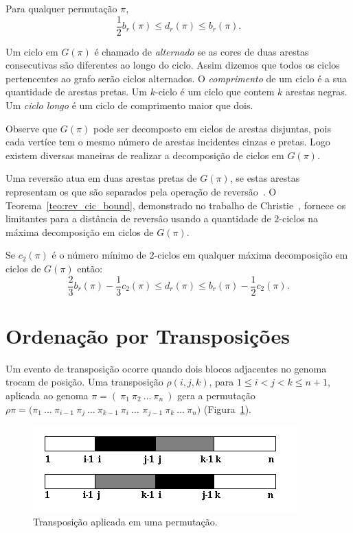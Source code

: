 \begin{teo}
\label{teo:rev_bkp_bound}
Para qualquer permutação $\pi$, 
\[\frac{1}{2} b_r(\pi) \leq d_r(\pi) \leq
  b_r(\pi).
\]
\end{teo}

Um ciclo em $G(\pi)$ é chamado de \textit{alternado} se as cores de
duas arestas consecutivas são diferentes ao longo do ciclo. Assim
dizemos que todos os ciclos pertencentes ao grafo serão ciclos
alternados. O \textit{comprimento} de um ciclo é a sua quantidade de
arestas pretas. Um $k$-ciclo é um ciclo que contem $k$ arestas
negras. Um \textit{ciclo longo} é um ciclo de comprimento maior que
dois.

Observe que $G(\pi)$ pode ser decomposto em ciclos de arestas
disjuntas, pois cada vertíce tem o mesmo número de arestas incidentes
cinzas e pretas. Logo existem diversas maneiras de realizar a
decomposição de ciclos em $G(\pi)$. 

Uma reversão atua em duas arestas pretas de $G(\pi)$, se estas arestas
representam os \bkp{} que são separados pela operação de
reversão~\cite{Christie*1998}. O Teorema~\ref{teo:rev_cic_bound},
demonstrado no trabalho de Christie~\cite{Christie*1998}, fornece os
limitantes para a distância de reversâo usando a quantidade de
$2$-ciclos na máxima decomposição em ciclos de $G(\pi)$.

\begin{teo}
\label{teo:rev_cic_bound}
Se $c_{2}(\pi)$ é o número mínimo de $2$-ciclos em qualquer máxima
decomposição em ciclos de $G(\pi)$ então: 
\[
\frac{2}{3} b_r(\pi)
- \frac{1}{3} c_{2}(\pi) \leq d_r(\pi) \leq b_r(\pi) - \frac{1}{2}
c_{2}(\pi).
\]
\end{teo}

\section{Ordenação por Transposições}
\label{sec:trans}
Um evento de transposição ocorre quando dois blocos adjacentes no
genoma trocam de posição. Uma transposição $\rho(i, j, k)$, para
$1 \leq i < j < k \leq n + 1$, aplicada ao genoma $\pi =
(~\pi_{1}~\pi_{2}~\ldots~\pi_{n}~)$ gera a permutação $\rho\pi =
(\pi_{1}~\ldots~\pi_{i-1}~\pi_{j}~\ldots~\pi_{k-1}~\pi_{i}~\ldots$
$\pi_{j-1}~\pi_{k}~\ldots~\pi_{n})$ (Figura~\ref{fig:transposition}).

\begin{figure}[h]
  \centering
  \includegraphics{images/transposition.png} 
  \caption{Transposição aplicada em uma permutação.}
  \label{fig:transposition}
\end{figure}

